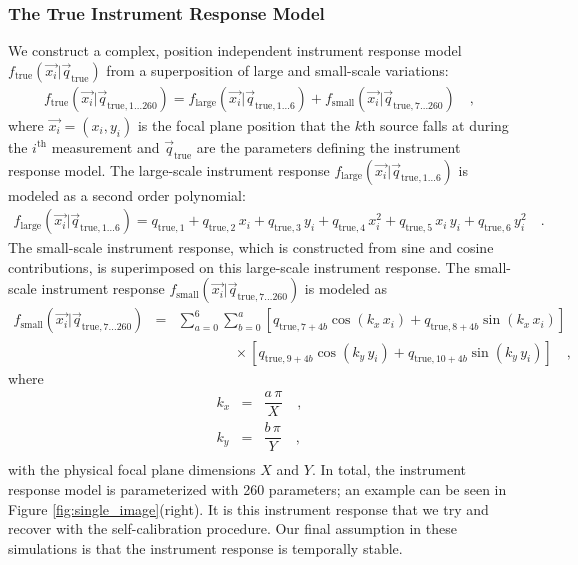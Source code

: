 \documentclass[manuscript]{aastex}
\newcommand{\true}{\text{true}}
\begin{document}
\subsubsection{The True Instrument Response Model}
\label{sec:instrument_response_model}
We construct a complex, position independent instrument response model $f_\true(\vec{x_i} | \vec{q}_{\true})$ from a superposition of large and small-scale variations:
\begin{eqnarray*}
f_\true(\vec{x_i} | \vec{q}_{\true, 1 \ldots 260}) = f_\text{large}(\vec{x_i} | \vec{q}_{\true, 1 \ldots 6}) + f_\text{small}(\vec{x_i} | \vec{q}_{\true, 7 \ldots 260}) \quad ,
\end{eqnarray*}
where $\vec{x_i} = (x_i, y_i)$ is the focal plane position that the $k$th source falls at during the $i^\text{th}$ measurement and $\vec{q}_\true$ are the parameters defining the instrument response model. The large-scale instrument response $f_\text{large}(\vec{x_i} | \vec{q}_{\true, 1 \ldots 6})$ is modeled as a second order polynomial:
\begin{eqnarray*}
f_\text{large}(\vec{x_i} | \vec{q}_{\true, 1 \ldots 6}) = q_{\true, 1} + q_{\true, 2} \, x_i + q_{\true, 3} \, y_i + q_{\true, 4} \, x_i^2 + q_{\true, 5} \, x_i \, y_i  + q_{\true, 6} \, y_i^2  \quad .
\end{eqnarray*}
The small-scale instrument response, which is constructed from sine and cosine contributions, is superimposed on this large-scale instrument response. The small-scale instrument response $f_\text{small}(\vec{x_i} | \vec{q}_{\true, 7 \ldots 260})$ is modeled as
\begin{eqnarray*}
f_\text{small}(\vec{x_i} | \vec{q}_{\true, 7\ldots 260})  & = &  \sum_{a=0}^6 \sum_{b=0}^a \left[ q_{\true, 7+4b} \cos (k_x \, x_i) + q_{\true, 8+4b} \sin (k_x \, x_i) \right] \\
& & \qquad \qquad \times \left[ q_{\true, 9+4b} \cos (k_y \, y_i) + q_{\true, 10+4b} \sin (k_y \, y_i) \right] \quad ,
\end{eqnarray*}
where
\begin{eqnarray*}
k_x & = & \dfrac{a \, \pi}{X} \quad ,\\
k_y & = & \dfrac{b \, \pi}{Y} \quad ,\\
\end{eqnarray*}
with the physical focal plane dimensions $X$ and $Y$. In total, the instrument response model is parameterized with 260 parameters; an example can be seen in Figure \ref{fig:single_image}(right). It is this instrument response that we try and recover with the self-calibration procedure. Our final assumption in these simulations is that the instrument response is temporally stable. 
\end{document}
